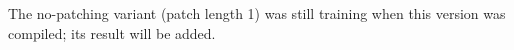The no-patching variant (patch length 1) was still training when this version was compiled; its result will be added. 

